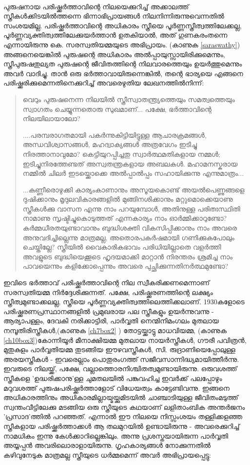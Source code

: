 \paragraph{}പുരുഷനായ പരിഷ്ക്കർത്താവിന്റെ നിലയെക്കുറിച്ച് അക്കാലത്ത് സ്ത്രീകൾക്കിടയിൽത്തന്നെ ഭിന്നാഭിപ്രായങ്ങൾ നിലനിന്നിരുന്നുവെന്നതിൽ സംശയമില്ല. പരിഷ്ക്കർത്താവിന്റെ അധികാരം സ്ത്രീയെ പൂർണ്ണസ്ത്രീത്വത്തിലേക്കല്ല, പൂർണ്ണവ്യക്തിത്വത്തിലേക്കുയർത്താൻ ഉതകിയാൽ, അത് ഗുണകരംതന്നെ എന്നായിരുന്നു കെ. സരസ്വതിയമ്മയുടെ അഭിപ്രായം. (കാണുക \ref{saraswathy}) അങ്ങനെയെങ്കിൽ പുരുഷന്റെ അധികാരം അൽപ്പായുസ്സായിരിക്കുമെന്നും, സ്ത്രീപുരുഷതുല്യത പുരുഷന്റെ ജീവിതത്തിന്റെ നിലവാരത്തെയും ഉയർത്തുമെന്നും അവർ വാദിച്ചു. താൻ ഒരു ഭർത്താവായിരുന്നെങ്കിൽ, തന്റെ ഭാര്യയെ എങ്ങനെ പരിഷ്ക്കരിക്കുമെന്നതിനെക്കുറിച്ച് അവരെഴുതിയ ലേഖനത്തിൽനിന്ന്:
\begin{quotation}
\noindent വെറും പുരുഷനെന്ന നിലയിൽ സ്ത്രീസ്വാതന്ത്ര്യത്തെയും സമത്വത്തെയും സ്വാഗതം ചെയ്യുന്നതൊരു സുഖമാണ്... പക്ഷേ, ഭർത്താവിന്റെ നിലയിലായാലോ?

\noindent
....പരമ്പരാഗതമായി പകർന്നുകിട്ടിയിട്ടുള്ള ആചാരക്രമങ്ങൾ, അന്ധവിശ്വാസങ്ങൾ, മഹദ്വാക്യങ്ങൾ അത്രവേഗം ഇടിച്ചു നിരത്താനാവുമോ? കെട്ടിയുറപ്പിച്ചതു സ്വാർത്ഥമതികളായ നമ്മൾ; ഇടിച്ചുനിരത്തേണ്ടത് അസ്വതന്ത്രകളായ അബലകൾ. മഹാമനസ്കരായ നമ്മിൽ ചിലർ ഇടയ്ക്കൊക്കെ അൽപ്പാൽപ്പം സഹായിക്കുന്നു എന്നുമാത്രം...

\noindent
...കണ്ണീരൊഴുക്കി കാര്യംകാണാനും അസൂയകൊണ്ട് അയൽപെണ്ണുങ്ങളെ ദുഷിക്കാനും മൃദുലവികാരങ്ങളിൽ മുങ്ങിനശിക്കാനും മറ്റുമൊക്കെയാണു സ്ത്രീകൾക്കു വാസന എന്നു നാം പറയുമ്പോൾ, അതിനുള്ള പരിതഃസ്ഥിതി നാമാണു സൃഷ്ടിച്ചുകൊടുത്തത് എന്നകാര്യം നാം ഓർമ്മിക്കാറുണ്ടോ? കർമ്മധീരതയുണ്ടാവാനും ബുദ്ധിശക്തി വികസിപ്പിക്കാനും നാം അവരെ അനുവദിച്ചില്ലെന്നു മാത്രമല്ല, അതൊരപകർഷമായി ഗണിക്കുകപോലും ചെയ്തില്ലേ? സ്ത്രീയിൽ വൈകാരികഭാവം പരിധിയില്ലാതെ വളർത്തി അവളുടെ ബുദ്ധിയെക്കൂടെ ഹൃദയമാക്കി മാറ്റാൻ നിരന്തരം ശ്രമിച്ച നാം പാവയെന്നും കളിക്കോപ്പെന്നും അവരെ പുച്ഛിക്കുന്നതിനർത്ഥമുണ്ടോ?
\end{quotation}


ഇവിടെ ഭർത്താവ് പരിഷ്ക്കർത്താവിന്റെ നില സ്വീകരിക്കണമെന്നാണ് സരസ്വതിയമ്മ നിർദ്ദേശിക്കുന്നത്. പക്ഷേ, പരിഷ്ക്കരണത്തിന്റെ ലക്ഷ്യം സ്ത്രീത്വമുണ്ടാക്കലല്ല, സ്ത്രീയെ പൂർണ്ണവ്യക്തിത്വത്തിലെത്തിക്കലാണ്.
1930കളോടെ പരിഷ്ക്കരണപ്രസ്ഥാനങ്ങളിൽ പ്രമുഖരായ പല സ്ത്രീകളും ഉയർന്നുവന്നു - ആര്യാപള്ളം, ദേവകി നരിക്കാട്ടിരി, പാർവ്വതി നെന്മിനിമംഗലം മുതലായ നമ്പൂതിരിസ്ത്രീകൾ,(കാണുക \ref{ch7box2} ) തോട്ടയ്ക്കാട്ടു മാധവിയമ്മ, (കാണുക \ref{ch10box3})കോന്നിയൂർ മീനാക്ഷിയമ്മ മുതലായ നായർസ്ത്രീകൾ, ഗൗരീ പവിത്രൻ, മുതുകുളം പാർവ്വതിയമ്മ തുടങ്ങിയ ഈഴവസ്ത്രീകൾ, സി. രുദ്രാണിയെപ്പോലുള്ള അരയസ്ത്രീകൾ - ഇവരെല്ലാം പൊതുരംഗത്ത് സജീവസാന്നിദ്ധ്യമായിത്തീർന്നു. ഇവരുടെ നിലയ്ക്ക്, പക്ഷേ, വല്ലാത്തൊരനിശ്ചിതത്വമുണ്ടായിരുന്നു. ഒരുവശത്ത് സ്ത്രീകളെ 'ഉദ്ധരിക്കാനു'ള്ള ചുമതലയിൽ പങ്കുവഹിച്ച ഇവർക്ക് പലപ്പോഴും മറുവശത്ത് പുരുഷപരിഷ്ക്കർത്താളോട് വിധേയത്വം കാട്ടേണ്ടിവന്നു. ഇങ്ങനെ അധികാരത്തിനും അധികാരമില്ലായ്മയ്ക്കുമിടയിൽ ചാഞ്ചാടിയുള്ള ജീവിതംമടുത്ത് സ്വന്തംവീട്ടിലേക്കു മടങ്ങിയ ഒരു സ്ത്രീയുടെ കഥയാണ് ലളിതാംബിക അന്തർജനം 'പ്രസാദ'ത്തിൽ പറഞ്ഞത്. എന്നാൽ ഈ നിലയെ നിസ്സംശയം തള്ളിക്കളഞ്ഞ സ്ത്രീകളായ പരിഷ്ക്കർത്താക്കൾ ആ തലമുറയിൽ ഉണ്ടായിരുന്നു - അവരെക്കുറിച്ച് നാമധികം ഇന്നു കേൾക്കാറില്ലെങ്കിലും. അന്നു പ്രശസ്തയായിരുന്ന പാർവ്വതി അയ്യപ്പൻ അവരിലൊരാളായിരുന്നു. ഗൃഹകാര്യങ്ങൾ നോക്കുന്നതിൽ കഴിവുനേടുക മാത്രമല്ല സ്ത്രീയുടെ ധർമ്മമെന്ന് അവർ അഭിപ്രായപ്പെട്ടു:


